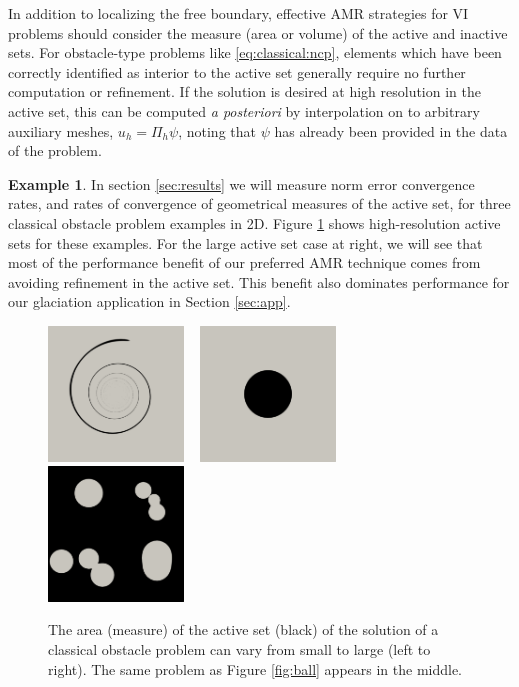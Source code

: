 \documentclass[]{interact}
\theoremstyle{plain}%
\theoremstyle{definition}
\newtheorem{example}[theorem]{Example}
\theoremstyle{remark}
\begin{document}
In addition to localizing the free boundary, effective AMR strategies for VI problems should consider the measure (area or volume) of the active and inactive sets.  For obstacle-type problems like \eqref{eq:classical:ncp}, elements which have been correctly identified as interior to the active set generally require no further computation or refinement.  If the solution is desired at high resolution in the active set, this can be computed \emph{a posteriori} by interpolation on to arbitrary auxiliary meshes, $u_h = \Pi_h \psi$, noting that $\psi$ has already been provided in the data of the problem.

\begin{example}  In section \ref{sec:results} we will measure norm error convergence rates, and rates of convergence of geometrical measures of the active set, for three classical obstacle problem examples in 2D.  Figure \ref{fig:activesizes} shows high-resolution active sets for these examples.  For the large active set case at right, we will see that most of the performance benefit of our preferred AMR technique comes from avoiding refinement in the active set.  This benefit also dominates performance for our glaciation application in Section \ref{sec:app}.
\end{example}

\begin{figure}[ht]
\noindent \hspace{-1mm} \mbox{\includegraphics[width=0.32\textwidth]{static/spiral.png} \,
\includegraphics[width=0.32\textwidth]{static/sphere.png} \,
\includegraphics[width=0.32\textwidth]{static/blisters.png}}
\caption{The area (measure) of the active set (black) of the solution of a classical obstacle problem can vary from small to large (left to right).  The same problem as Figure \ref{fig:ball} appears in the middle.}
\label{fig:activesizes}
\end{figure}
\end{document}
